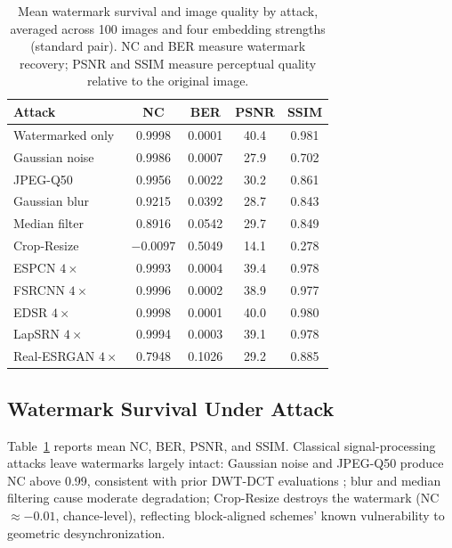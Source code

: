 \documentclass[conference]{IEEEtran}
\begin{document}
\begin{table}[t]
\caption{Mean watermark survival and image quality by attack, averaged
across 100 images and four embedding strengths (standard pair). NC and
BER measure watermark recovery; PSNR and SSIM measure perceptual
quality relative to the original image.}
\label{tab:survival}
\centering
\begin{tabular}{lcccc}
\toprule
Attack & NC & BER & PSNR & SSIM \\
\midrule
Watermarked only       & 0.9998  & 0.0001 & 40.4 & 0.981 \\
Gaussian noise         & 0.9986  & 0.0007 & 27.9 & 0.702 \\
JPEG-Q50               & 0.9956  & 0.0022 & 30.2 & 0.861 \\
Gaussian blur          & 0.9215  & 0.0392 & 28.7 & 0.843 \\
Median filter          & 0.8916  & 0.0542 & 29.7 & 0.849 \\
Crop-Resize            & $-0.0097$ & 0.5049 & 14.1 & 0.278 \\
ESPCN $4\times$        & 0.9993  & 0.0004 & 39.4 & 0.978 \\
FSRCNN $4\times$       & 0.9996  & 0.0002 & 38.9 & 0.977 \\
EDSR $4\times$         & 0.9998  & 0.0001 & 40.0 & 0.980 \\
LapSRN $4\times$       & 0.9994  & 0.0003 & 39.1 & 0.978 \\
Real-ESRGAN $4\times$  & 0.7948  & 0.1026 & 29.2 & 0.885 \\
\bottomrule
\end{tabular}
\end{table}

\subsection{Watermark Survival Under Attack}
Table~\ref{tab:survival} reports mean NC, BER, PSNR, and SSIM.
Classical signal-processing attacks leave watermarks largely intact:
Gaussian noise and JPEG-Q50 produce NC above 0.99, consistent with prior
DWT-DCT evaluations \cite{alhaj2007}; blur and median filtering cause
moderate degradation; Crop-Resize destroys the watermark
(NC $\approx -0.01$, chance-level), reflecting block-aligned schemes'
known vulnerability to geometric desynchronization.
\end{document}
